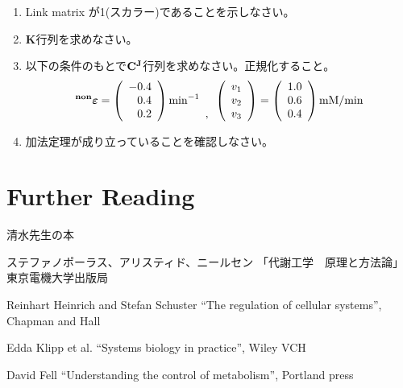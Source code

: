 \begin{enumerate}
\item Link matrix が1(スカラー)であることを示しなさい。
\item {\bf K}行列を求めなさい。
\item 以下の条件のもとで\({\bf C^J}\)行列を求めなさい。正規化すること。\\
\[
{}^{\bf non}{\boldsymbol \varepsilon}=\left(
\begin{array}{r}
-0.4\\
0.4\\
0.2\\
\end{array}
\right)
{\rm min}^{-1}
\begin{array}{c}
 \\
 \\
,\\
\end{array}
\left(
\begin{array}{c}
v_1\\
v_2\\
v_3
\end{array}
\right)
=
\left(
\begin{array}{r}
1.0\\
0.6\\
0.4\\
\end{array}
\right)
{\rm mM/min}
\]
\item 加法定理が成り立っていることを確認しなさい。
\end{enumerate}


\section{Further Reading}
清水先生の本

ステファノポーラス、アリスティド、ニールセン 
「代謝工学　原理と方法論」　東京電機大学出版局

Reinhart Heinrich and Stefan Schuster 
“The regulation of cellular systems”, Chapman and Hall

Edda Klipp et al. 
“Systems biology in practice”, Wiley VCH

David Fell
“Understanding the control of metabolism”, Portland press

